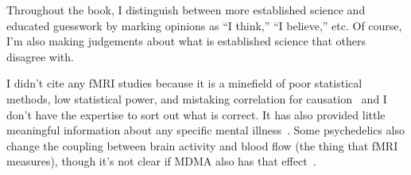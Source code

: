 \documentclass[11pt,oneside]{book}
\let\cite\parencite
\begin{document}
Throughout the book, I distinguish between more established science and educated guesswork by marking opinions as \enquote{I think,} \enquote{I believe,} etc. Of course, I'm also making judgements about what is established science that others disagree with.

I didn't cite any fMRI studies because it is a minefield of poor statistical methods, low statistical power, and mistaking correlation for causation~\cite{hoelNeuroscience} and I don't have the expertise to sort out what is correct. It has also provided little meaningful information about any specific mental illness~\cite{etkin2019reckoning}. Some psychedelics also change the coupling between brain activity and blood flow (the thing that fMRI measures), though it's not clear if MDMA also has that effect~\cite{padawerNeurovascularCoupling}.
\end{document}
